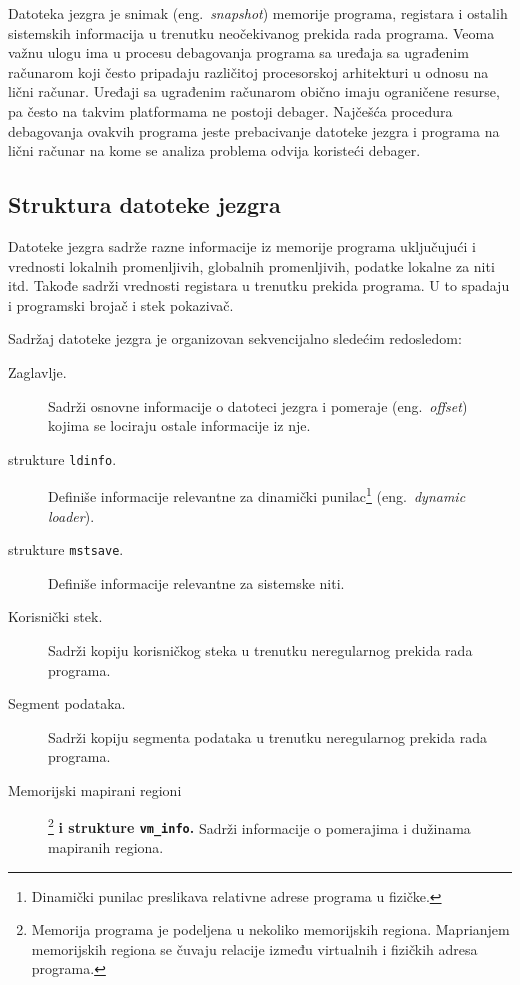 \documentclass[12pt,oneside]{memoir}
\begin{document}
Datoteka jezgra je snimak (eng.~\emph{snapshot}) memorije programa, registara i ostalih sistemskih informacija u trenutku neočekivanog prekida rada programa. Veoma važnu ulogu ima u procesu debagovanja programa sa uređaja sa ugrađenim računarom koji često pripadaju različitoj procesorskoj arhitekturi u odnosu na lični računar. Uređaji sa ugrađenim računarom obično imaju ograničene resurse, pa često na takvim platformama ne postoji debager. Najčešća procedura debagovanja ovakvih programa jeste prebacivanje datoteke jezgra i programa na lični računar na kome se analiza problema odvija koristeći debager.

\subsection{Struktura datoteke jezgra}

Datoteke jezgra sadrže razne informacije iz memorije programa uključujući i vrednosti lokalnih promenljivih, globalnih promenljivih, podatke lokalne za niti itd. Takođe sadrži vrednosti registara u trenutku prekida programa. U to spadaju i programski brojač i stek pokazivač.

Sadržaj datoteke jezgra je organizovan sekvencijalno sledećim redosledom:

\begin{description}
	\item[Zaglavlje.]
	Sadrži osnovne informacije o datoteci jezgra i pomeraje (eng.~\emph{offset}) kojima se lociraju ostale informacije iz nje.
	\item[strukture \texttt{ldinfo}.]   
	Definiše informacije relevantne za dinamički punilac\footnote{Dinamički punilac preslikava relativne adrese programa u fizičke.} (eng.~\emph{dynamic loader}).
	\item[strukture \texttt{mstsave}.]
	Definiše informacije relevantne za sistemske niti.
	\item[Korisnički stek.]
	Sadrži kopiju korisničkog steka u trenutku neregularnog prekida rada programa.
	\item[Segment podataka.]   
	Sadrži kopiju segmenta podataka u trenutku neregularnog prekida rada programa.
	\item[Memorijski mapirani regioni]\footnote{Memorija programa je podeljena u nekoliko memorijskih regiona. Maprianjem memorijskih regiona se čuvaju relacije između virtualnih i fizičkih adresa programa.} \textbf{i strukture \texttt{vm\_info}.}
	Sadrži informacije o pomerajima i dužinama mapiranih regiona.
\end{description}
\end{document}
